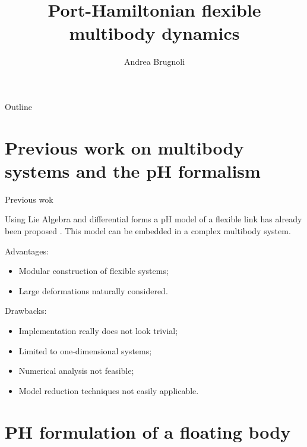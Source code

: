 \documentclass[aspectratio=169]{ISAE-Beamer}
\title[Virtual INFIDHEM meeting]{Port-Hamiltonian flexible multibody dynamics}
\institute[ISAE]
{\inst{1}ISAE-SUPAERO, Toulouse}
\author[Andrea Brugnoli]{Andrea Brugnoli}
\begin{document}
\maketitle

\begin{frame}{Outline}

\tableofcontents

\end{frame}

\section{Previous work on multibody systems and the pH formalism}

\begin{frame}{Previous wok}

Using Lie Algebra and differential forms a pH model of a flexible link has already been proposed . This model can be embedded in a complex multibody system. \\
\begin{overlayarea}{\textwidth}{0.55\textheight}
	\setlength{\abovedisplayskip}{1pt}
	\setlength{\belowdisplayskip}{1pt}
Advantages:
\begin{itemize}
	\item {Modular construction of flexible systems;}
	\item {Large deformations naturally considered.}
\end{itemize}
Drawbacks:
\begin{itemize}
	\item {Implementation really does not look trivial;}
	\item {Limited to one-dimensional systems;}
	\item {Numerical analysis not feasible;}
	\item {Model reduction techniques not easily applicable.} 
\end{itemize}
\end{overlayarea}
\end{frame}

\section{PH formulation of a floating body}
\end{document}
